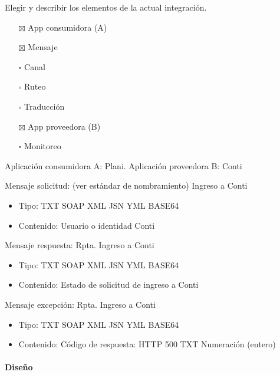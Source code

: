 \documentclass[
  paper=a4,
  ,captions=tableheading
]{scrartcl}
\providecommand{\tightlist}{%
  \setlength{\itemsep}{0pt}\setlength{\parskip}{0pt}}
\begin{document}
Elegir y describir los elementos de la actual integración.

\begin{itemize}
\tightlist
\item[$\boxtimes$]
  App consumidora (A)
\item[$\boxtimes$]
  Mensaje
\item[$\square$]
  Canal
\item[$\square$]
  Ruteo
\item[$\square$]
  Traducción
\item[$\boxtimes$]
  App proveedora (B)
\item[$\square$]
  Monitoreo
\end{itemize}

Aplicación consumidora A: Plani. Aplicación proveedora B: Conti

Mensaje solicitud: (ver estándar de nombramiento) Ingreso a Conti

\begin{itemize}
\tightlist
\item
  Tipo: TXT \textbar{} SOAP \textbar{} XML \textbar{} JSN \textbar{} YML
  \textbar{} BASE64
\item
  Contenido: Usuario o identidad Conti
\end{itemize}

Mensaje respuesta: Rpta. Ingreso a Conti

\begin{itemize}
\tightlist
\item
  Tipo: TXT \textbar{} SOAP \textbar{} XML \textbar{} JSN \textbar{} YML
  \textbar{} BASE64
\item
  Contenido: Estado de solicitud de ingreso a Conti
\end{itemize}

Mensaje excepción: Rpta. Ingreso a Conti

\begin{itemize}
\tightlist
\item
  Tipo: TXT \textbar{} SOAP \textbar{} XML \textbar{} JSN \textbar{} YML
  \textbar{} BASE64
\item
  Contenido: Código de respuesta: HTTP 500 \textbar{} TXT \textbar{}
  Numeración (entero)
\end{itemize}

\paragraph{Diseño}\label{sec:diseuxf1o-4}
\end{document}
